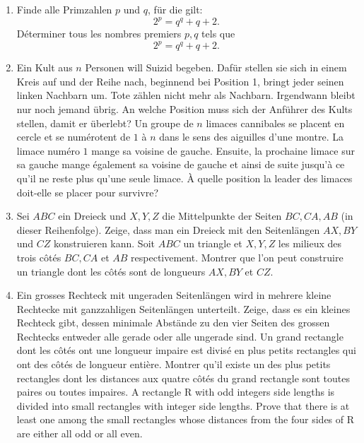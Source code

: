 \documentclass[language=german,style=exam]{smo}
\title{\translation{SMO - Weisse Prüfung}{OSM - Test blanc}{???}}
\begin{document}
\begin{enumerate}[label=\textbf{\arabic*.}]

\bigskip\bigskip

\item\translation%
{Finde alle Primzahlen $p$ und $q$, für die gilt:
\[
2^p=q^q+q+2.
\]}
{Déterminer tous les nombres premiers $p,q$ tels que
\[
2^p=q^q+q+2.
\]}
{}


\bigskip\bigskip

\item\translation%
{Ein Kult aus $n$ Personen will Suizid begeben. Dafür stellen sie sich in einem Kreis auf und der Reihe nach, beginnend bei Position 1, bringt jeder seinen linken Nachbarn um. Tote zählen nicht mehr als Nachbarn. Irgendwann bleibt nur noch jemand übrig. An welche Position muss sich der Anführer des Kults stellen, damit er überlebt?}
{Un groupe de $n$ limaces cannibales se placent en cercle et se numérotent de $1$ à $n$ dans le sens des aiguilles d'une montre. La limace numéro $1$ mange sa voisine de gauche. Ensuite, la prochaine limace sur sa gauche mange également sa voisine de gauche et ainsi de suite jusqu'à ce qu'il ne reste plus qu'une seule limace. À quelle position la leader des limaces doit-elle se placer pour survivre? }
{}
{}

\bigskip\bigskip

\item\translation%
{Sei $ABC$ ein Dreieck und $X,Y,Z$ die Mittelpunkte der Seiten $BC,CA,AB$ (in dieser Reihenfolge). Zeige, dass man ein Dreieck mit den Seitenlängen $AX,BY$ und $CZ$ konstruieren kann.}
{Soit $ABC$ un triangle et $X,Y,Z$ les milieux des trois côtés $BC,CA$ et $AB$ respectivement. Montrer que l'on peut construire un triangle dont les côtés sont de longueurs $AX,BY$ et $CZ$.}
{}

\bigskip\bigskip

\item\translation%
{Ein grosses Rechteck mit ungeraden Seitenlängen wird in mehrere kleine Rechtecke mit ganzzahligen Seitenlängen unterteilt. Zeige, dass es ein kleines Rechteck gibt, dessen minimale Abstände zu den vier Seiten des grossen Rechtecks entweder alle gerade oder alle ungerade sind.}
{Un grand rectangle dont les côtés ont une longueur impaire est divisé en plus petits rectangles qui ont des côtés de longueur entière. Montrer qu'il existe un des plus petits rectangles dont les distances aux quatre côtés du grand rectangle sont toutes paires ou toutes impaires.}
{A rectangle R with odd integers side lengths is divided into small rectangles with integer side lengths. Prove that there is at least one among the small rectangles whose distances from the four sides of R are either all odd or all even.}


\end{enumerate}
\end{document}
